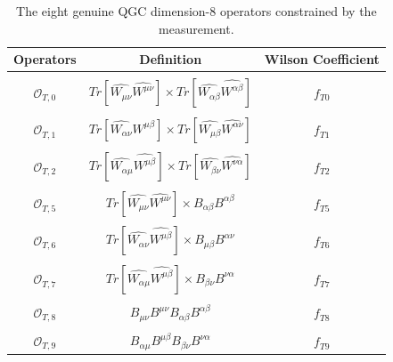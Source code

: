 \begin{table}[h]
    \caption{The eight genuine QGC dimension-8 operators constrained by the measurement. \label{tab:Dim8Operators}}
    \begin{center}
    \begin{tabular}{| c | c | c | }
        \hline 
        Operators & Definition & Wilson Coefficient \\
        \hline
         & & \\
        $\mathcal{O}_{T,0}$ & $Tr[ \hat{W_{\mu\nu}} \hat{W^{\mu\nu}}] \times Tr[\hat{W_{\alpha \beta}} \hat{W^{\alpha \beta}} ] $ & $f_{T0}$ \\
         & & \\
        $\mathcal{O}_{T,1}$ & $Tr[ \hat{W_{\alpha\nu}} W^{\mu\beta}] \times Tr[ \hat{ W_{\mu \beta}}\hat {W^{\alpha \nu}} ] $ & $f_{T1}$ \\
         & & \\
        $\mathcal{O}_{T,2}$ & $Tr[ \hat{W_{\alpha\mu}} \hat{W^{\mu\beta} }] \times Tr[\hat{W_{\beta\nu}} \hat{W^{\nu\alpha} }] $ & $f_{T2}$ \\
         & & \\
        $\mathcal{O}_{T,5}$ & $Tr[ \hat{W_{\mu\nu}} \hat{W^{\mu\nu} } ] \times B_{\alpha\beta}B^{\alpha\beta} $ & $f_{T5}$ \\
         & & \\
        $\mathcal{O}_{T,6}$ & $Tr[ \hat{W_{\alpha\nu}} \hat{W^{\mu\beta} } ] \times B_{\mu\beta}B^{\alpha\nu} $ & $f_{T6}$ \\
         & & \\
        $\mathcal{O}_{T,7}$ & $Tr[ \hat{W_{\alpha\mu}} \hat{W^{\mu\beta} }] \times  B_{\beta\nu}B^{\nu\alpha} $ & $f_{T7}$ \\
         & & \\
        $\mathcal{O}_{T,8}$ & $ B_{\mu\nu}B^{\mu\nu}B_{\alpha\beta}B^{\alpha\beta} $ & $f_{T8}$ \\
         & & \\
        $\mathcal{O}_{T,9}$ & $ B_{\alpha\mu}B^{\mu\beta} B_{\beta\nu}B^{\nu\alpha}$ & $f_{T9}$ \\
        \hline 
    \end{tabular}
    \end{center}
\end{table}    

